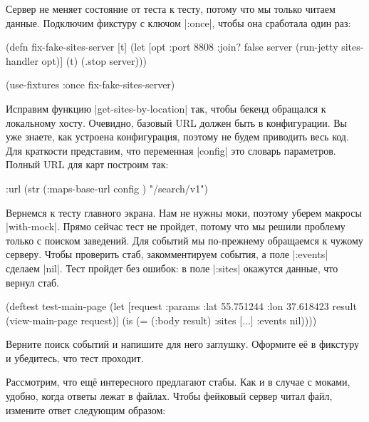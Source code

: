 Сервер не меняет состояние от теста к тесту, потому что мы только читаем
данные. Подключим фикстуру с ключом \spverb|:once|, чтобы она сработала один
раз:

\begin{english}
  \begin{clojure}
(defn fix-fake-sites-server [t]
  (let [opt {:port 8808 :join? false}
        server (run-jetty sites-handler opt)]
    (t)
    (.stop server)))

(use-fixtures :once fix-fake-sites-server)
  \end{clojure}
\end{english}


Исправим функцию \spverb|get-sites-by-location| так, чтобы бекенд обращался к
локальному хосту. Очевидно, базовый URL должен быть в конфигурации. Вы уже
знаете, как устроена конфигурация, поэтому не будем приводить весь код. Для
краткости представим, что переменная \spverb|config| это словарь
параметров. Полный URL для карт построим так:

\begin{english}
  \begin{clojure}
{:url (str (:maps-base-url config ) "/search/v1")}
  \end{clojure}
\end{english}

Вернемся к тесту главного экрана. Нам не нужны моки, поэтому уберем макросы
\spverb|with-mock|. Прямо сейчас тест не пройдет, потому что мы решили проблему
только с поиском заведений. Для событий мы по-прежнему обращаемся к чужому
серверу. Чтобы проверить стаб, закомментируем события, а поле \spverb|:events|
сделаем \spverb|nil|. Тест пройдет без ошибок: в поле \spverb|:sites| окажутся
данные, что вернул стаб.

\begin{english}
  \begin{clojure}
(deftest test-main-page
  (let [request {:params {:lat 55.751244
                          :lon 37.618423}}
        result (view-main-page request)]
    (is (= (:body result) {:sites [...] :events nil}))))
  \end{clojure}
\end{english}

Верните поиск событий и напишите для него заглушку. Оформите е\"{е} в фикстуру и
убедитесь, что тест проходит.

Рассмотрим, что ещ\"{е} интересного предлагают стабы. Как и в случае с моками,
удобно, когда ответы лежат в файлах. Чтобы фейковый сервер читал файл, измените
ответ следующим образом:

